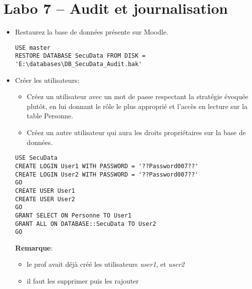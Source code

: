 \documentclass[a4paper]{article}
\begin{document}
\section{Labo 7 -- Audit et journalisation}





\begin{itemize}



\item Restaurez la base de données présente sur Moodle.
\begin{example} \begin{verbatim}
USE master
RESTORE DATABASE SecuData FROM DISK = 'E:\databases\DB_SecuData_Audit.bak'
\end{verbatim} \end{example}



\item Créer les utilisateurs:
\begin{itemize}
    \item Créez un utilisateur avec un mot de passe respectant la stratégie évoquée plutôt, en lui donnant le rôle le plus approprié et l’accès en lecture sur la table Personne.
    \item Créez un autre utilisateur qui aura les droits propriétaires sur la base de données.
\end{itemize}
\begin{example} \begin{verbatim}
USE SecuData
CREATE LOGIN User1 WITH PASSWORD = '??Password007??'
CREATE LOGIN User2 WITH PASSWORD = '??Password007??'
GO
CREATE USER User1
CREATE USER User2
GO
GRANT SELECT ON Personne TO User1
GRANT ALL ON DATABASE::SecuData TO User2
GO
\end{verbatim}
\textbf{Remarque}:
\begin{itemize}
    \item le prof avait déjà créé les utilisateurs \textit{user1}, et \textit{user2}
    \item il faut les supprimer puis les rajouter
\end{itemize}
\end{example}







\end{itemize}
\end{document}
